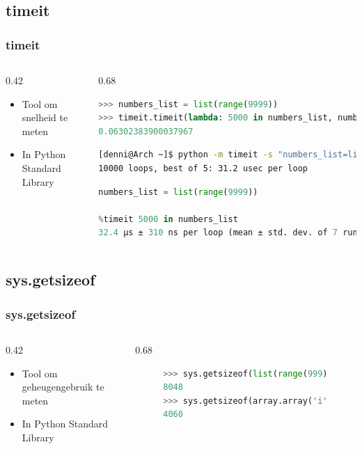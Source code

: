 \documentclass[aspectratio=169]{beamer}
\begin{document}
\subsection{timeit}
\begin{frame}[fragile]
  \frametitle{timeit}
  \begin{columns}
    \begin{column}{0.42\textwidth}
      \begin{itemize}
        \item Tool om snelheid te meten
        \item In Python Standard Library
      \end{itemize}
    \end{column}
    \begin{column}{0.68\textwidth}
      \begin{lstlisting}[language=Python, basicstyle=\small]
>>> numbers_list = list(range(9999))
>>> timeit.timeit(lambda: 5000 in numbers_list, number=1000)
0.06302383900037967
      \end{lstlisting}
      \begin{lstlisting}[language=bash, basicstyle=\small]
[denni@Arch ~]$ python -m timeit -s "numbers_list=list(range(9999))" "5000 in numbers_list"
10000 loops, best of 5: 31.2 usec per loop
      \end{lstlisting}
      \begin{lstlisting}[language=Python, basicstyle=\small]
numbers_list = list(range(9999))

%timeit 5000 in numbers_list
32.4 µs ± 310 ns per loop (mean ± std. dev. of 7 runs, 10000 loops each)
      \end{lstlisting}
    \end{column}
  \end{columns}
\end{frame}

\subsection{sys.getsizeof}
\begin{frame}[fragile]
  \frametitle{sys.getsizeof}
  \begin{columns}
    \begin{column}{0.42\textwidth}
      \begin{itemize}
        \item Tool om geheugengebruik te meten
        \item In Python Standard Library
      \end{itemize}
    \end{column}
    \begin{column}{0.68\textwidth}
      \begin{figure}
        \begin{lstlisting}[language=Python, basicstyle=\small]
>>> sys.getsizeof(list(range(999)))
8048
>>> sys.getsizeof(array.array('i', list(range(999))))
4060
        \end{lstlisting}
      \end{figure}
    \end{column}
  \end{columns}
\end{frame}
\end{document}

